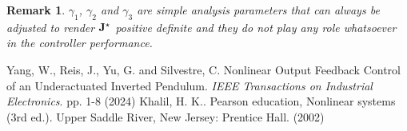 \documentclass[journal,onecolumn]{IEEEtran}
\newtheorem{remark}{Remark}
\begin{document}
\begin{remark}
	$\gamma_1$, $\gamma_2$ and $\gamma_3$ are simple analysis parameters that can always be adjusted to render $\mathbf{J}^{\star}$ positive definite and they do not play any role whatsoever in the controller performance.
\end{remark}

\begin{thebibliography}{9}
Yang, W., Reis, J., Yu, G. and Silvestre, C. Nonlinear Output Feedback Control of an Underactuated Inverted Pendulum. {\em IEEE Transactions on Industrial Electronics}. pp. 1-8 (2024)
Khalil, H. K.. Pearson education, Nonlinear systems (3rd ed.). Upper Saddle River, New Jersey: Prentice Hall. (2002)
\end{thebibliography}
\end{document}
